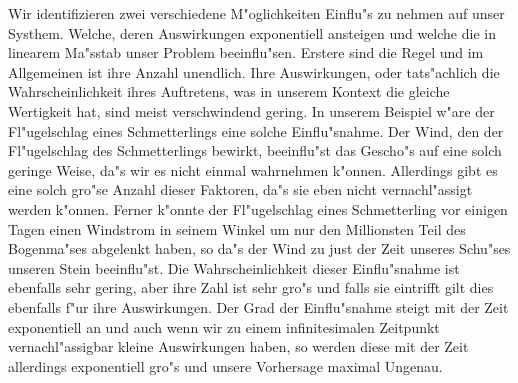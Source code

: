 \documentclass[a5paper,8pt]{book}
\begin{document}
Wir identifizieren zwei verschiedene M"oglichkeiten Einflu"s zu nehmen auf unser Systhem. Welche, deren Auswirkungen exponentiell ansteigen und welche die in linearem 
Ma"sstab unser Problem beeinflu"sen. Erstere sind die Regel und im Allgemeinen ist ihre Anzahl unendlich. Ihre Auswirkungen, oder tats"achlich die Wahrscheinlichkeit ihres 
Auftretens, was in unserem Kontext die gleiche Wertigkeit hat, sind meist verschwindend gering. In unserem Beispiel w"are der Fl"ugelschlag eines Schmetterlings eine solche 
Einflu"snahme. Der Wind, den der Fl"ugelschlag des Schmetterlings bewirkt, beeinflu"st das Gescho"s auf eine solch geringe Weise, da"s wir es nicht einmal wahrnehmen k"onnen. 
Allerdings gibt es eine solch gro"se Anzahl dieser Faktoren, da"s sie eben nicht vernachl"assigt werden k"onnen.
Ferner k"onnte der Fl"ugelschlag eines Schmetterling vor einigen Tagen einen Windstrom in seinem Winkel um nur den Millionsten Teil des Bogenma"ses abgelenkt haben, so da"s 
der Wind zu just der Zeit unseres Schu"ses unseren Stein beeinflu"st. Die Wahrscheinlichkeit dieser Einflu"snahme ist ebenfalls sehr gering, aber ihre Zahl ist sehr gro"s und 
falls sie eintrifft gilt dies ebenfalls f"ur ihre Auswirkungen.
Der Grad der Einflu"snahme steigt mit der Zeit exponentiell an und auch wenn wir zu einem infinitesimalen Zeitpunkt vernachl"assigbar kleine Auswirkungen haben, so werden diese 
mit der Zeit allerdings exponentiell gro"s und unsere Vorhersage maximal Ungenau.\\
\end{document}
